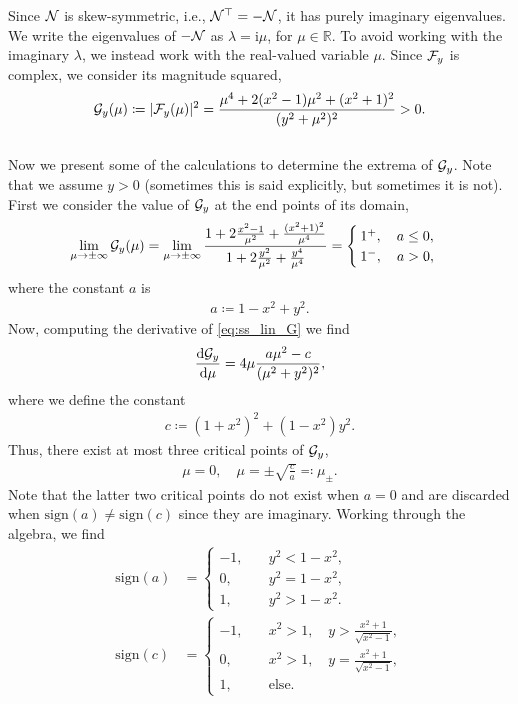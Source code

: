 \documentclass[a4paper,10pt]{article}
\newcommand{\im}{\mathrm{i}}
\begin{document}
Since ${\cal N}$ is skew-symmetric, i.e., ${\cal N}^\top = - {\cal N}$, it has purely imaginary eigenvalues. We write the eigenvalues of $-{\cal N}$ as $\lambda = \im \mu$, for $\mu \in \mathbb{R}$. To avoid working with the imaginary $\lambda$, we instead work with the real-valued variable $\mu$. Since ${\cal F}_y$ is complex, we consider its magnitude squared,
\begin{align}
\label{eq:ss_lin_G}
{\cal G}_y(\mu) \coloneqq |{\cal F}_y(\mu)|^2 = 
\frac{\mu^4 + 2(x^2-1)\mu^2 + (x^2 + 1)^2}{(y^2 + \mu^2)^2} > 0.
\end{align}\\

Now we present some of the calculations to determine the extrema of ${\cal G}_y$. Note that we assume $y > 0$ (sometimes this is said explicitly, but sometimes it is not). First we consider the value of ${\cal G}_y$ at the end points of its domain,
\begin{align*}
\lim_{\mu \to \pm \infty} {\cal G}_y(\mu) 
=
\lim_{\mu \to \pm \infty} \frac{1 + 2 \frac{x^2-1}{\mu^2} + \frac{(x^2+1)^2}{\mu^4}}{1 + 2 \frac{y^2}{\mu^2} + \frac{y^4}{\mu^4}}
=
\begin{cases}
1^+, \quad a \leq 0, \\
1^-, \quad a > 0,
\end{cases}
\end{align*}
where the constant $a$ is
\begin{align*}
a \coloneqq 1 - x^2  + y^2.
\end{align*}
Now, computing the derivative of \eqref{eq:ss_lin_G} we find
\begin{align*}
\frac{\textrm{d} {\cal G}_y}{\textrm{d} \mu} = 
4 \mu \frac{a \mu^2 - c}{(\mu^2 + y^2)^2},
\end{align*}
where we define the constant
\begin{align*}
c \coloneqq (1+x^2)^2 + (1 - x^2)y^2.
\end{align*}
Thus, there exist at most three critical points of ${\cal G}_y$,
\begin{align*}
\mu = 0, \quad \mu = \pm \sqrt{\frac{c}{a}} \eqqcolon \mu_{\pm}.
\end{align*}
Note that the latter two critical points do not exist when $a = 0$ and are discarded when $\textrm{sign}(a) \neq \textrm{sign}(c)$ since they are imaginary.
Working through the algebra, we find
\begin{align*}
\textrm{sign}(a) 
&=
\begin{cases}
-1, \quad &y^2 < 1 - x^2, \\
0, \quad &y^2 = 1-x^2, \\
1, \quad &y^2 > 1-x^2.
\end{cases} \\
\textrm{sign}(c) 
&=
\begin{cases}
-1, \quad &x^2 > 1, \quad y > \frac{x^2+1}{\sqrt{x^2-1}}, \\
0, \quad &x^2 > 1, \quad y = \frac{x^2+1}{\sqrt{x^2-1}}, \\
1, \quad &\textrm{else}.
\end{cases}
\end{align*}
\end{document}
